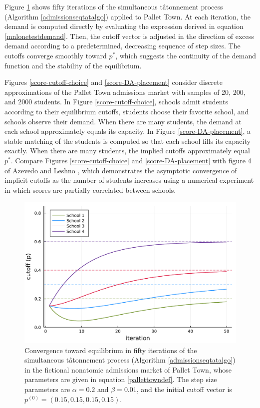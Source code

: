 \documentclass[12pt]{article}
\numberwithin{equation}{subsection}
\theoremstyle{definition}
\begin{document}
Figure \ref{tat-iter-cutoff} shows fifty iterations of the simultaneous t\^{a}tonnement process (Algorithm \ref{admissionseqtatalgo}) applied to Pallet Town. At each iteration, the demand is computed directly by evaluating the expression derived in equation \eqref{mnlonetestdemand}. Then, the cutoff vector is adjusted in the direction of excess demand according to a predetermined, decreasing sequence of step sizes. The cutoffs converge smoothly toward $p^*$, which suggests the continuity of the demand function and the stability of the equilibrium. 

Figures \ref{score-cutoff-choice} and \ref{score-DA-placement} consider discrete approximations of the Pallet Town admissions market with samples of 20, 200, and 2000 students. In Figure \ref{score-cutoff-choice}, schools admit students according to their equilibrium cutoffs, students choose their favorite school, and schools observe their demand. When there are many students, the demand at each school approximately equals its capacity. In Figure \ref{score-DA-placement}, a stable matching of the students is computed so that each school fills its capacity exactly. When there are many students, the implied cutoffs approximately equal $p^*$. Compare Figures \ref{score-cutoff-choice} and \ref{score-DA-placement} with figure 4 of Azevedo and Leshno \parencite*{supplydemandfw}, which demonstrates the asymptotic convergence of implicit cutoffs as the number of students increases using a numerical experiment in which scores are partially correlated between schools. 

\begin{figure}
\begin{center}\includegraphics[width=\linewidth, ]{plots/tat-iter-cutoff.pdf}\end{center}
\captionsetup{singlelinecheck=off}
    \caption[.]{Convergence toward equilibrium in fifty iterations of the simultaneous t\^{a}tonnement process (Algorithm \ref{admissionseqtatalgo}) in the fictional nonatomic admissions market of Pallet Town, whose parameters are given in equation \eqref{pallettowndef}. The step size parameters are $\alpha = 0.2$ and $\beta = 0.01$, and the initial cutoff vector is $p^{(0)} = (0.15, 0.15, 0.15, 0.15)$. }
\label{tat-iter-cutoff}
\end{figure}
\end{document}
